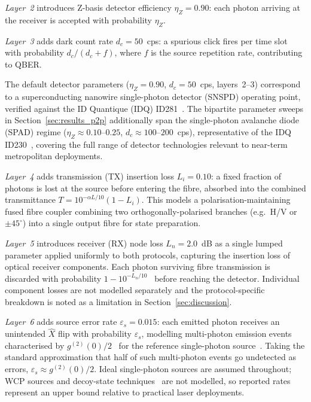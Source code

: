 \documentclass[12pt]{article}
\begin{document}
\textit{Layer~2} introduces Z-basis detector efficiency $\eta_Z = 0.90$: each photon arriving at the receiver is accepted with probability $\eta_Z$.

\textit{Layer~3} adds dark count rate $d_c = 50$~cps: a spurious click fires per time slot with probability $d_c / (d_c + f)$, where $f$ is the source repetition rate, contributing to QBER.

The default detector parameters ($\eta_Z = 0.90$, $d_c = 50$~cps, layers~2--3) correspond to a superconducting nanowire single-photon detector (SNSPD) operating point, verified against the ID Quantique (IDQ) ID281~\cite{idq_id281}. The bipartite parameter sweeps in Section~\ref{sec:results_p2p} additionally span the single-photon avalanche diode (SPAD) regime ($\eta_Z \approx 0.10$--$0.25$, $d_c \approx 100$--$200$~cps), representative of the IDQ ID230~\cite{idq_id230}, covering the full range of detector technologies relevant to near-term metropolitan deployments.

\textit{Layer~4} adds transmission (TX) insertion loss $L_i = 0.10$: a fixed fraction of photons is lost at the source before entering the fibre, absorbed into the combined transmittance $T = 10^{-\alpha L/10}(1 - L_i)$. This models a polarisation-maintaining fused fibre coupler combining two orthogonally-polarised branches (e.g.\ H/V or $\pm45^\circ$) into a single output fibre for state preparation.

\textit{Layer~5} introduces receiver (RX) node loss $L_n = 2.0$~dB as a single lumped parameter applied uniformly to both protocols, capturing the insertion loss of optical receiver components. Each photon surviving fibre transmission is discarded with probability $1 - 10^{-L_n/10}$~\cite{Agrawal_2010} before reaching the detector. Individual component losses are not modelled separately and the protocol-specific breakdown is noted as a limitation in Section~\ref{sec:discussion}.

\textit{Layer~6} adds source error rate $\varepsilon_s = 0.015$: each emitted photon receives an unintended $\hat{X}$ flip with probability $\varepsilon_s$, modelling multi-photon emission events characterised by $g^{(2)}(0)/2$~\cite{Waks_2002} for the reference single-photon source~\cite{QuandelaSPS}. Taking the standard approximation that half of such multi-photon events go undetected as errors, $\varepsilon_s \approx g^{(2)}(0)/2$. Ideal single-photon sources are assumed throughout; WCP sources and decoy-state techniques~\cite{Lo_decoys} are not modelled, so reported rates represent an upper bound relative to practical laser deployments.
\end{document}
